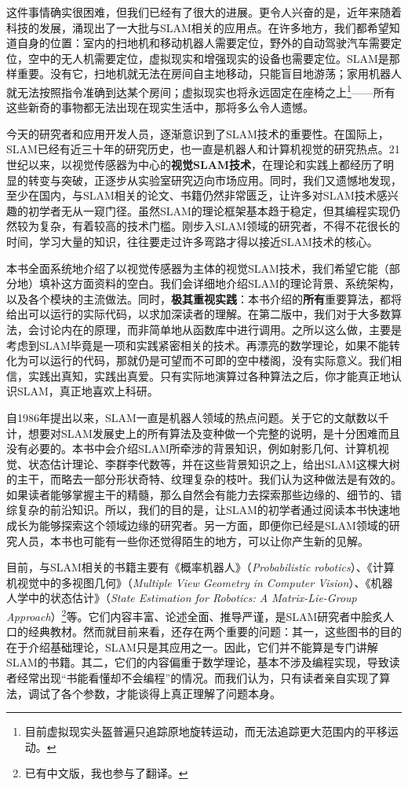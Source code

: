 这件事情确实很困难，但我们已经有了很大的进展。更令人兴奋的是，近年来随着科技的发展，涌现出了一大批与SLAM相关的应用点。在许多地方，我们都希望知道自身的位置：室内的扫地机和移动机器人需要定位，野外的自动驾驶汽车需要定位，空中的无人机需要定位，虚拟现实和增强现实的设备也需要定位。SLAM是那样重要。没有它，扫地机就无法在房间自主地移动，只能盲目地游荡；家用机器人就无法按照指令准确到达某个房间；虚拟现实也将永远固定在座椅之上\footnote{目前虚拟现实头盔普遍只追踪原地旋转运动，而无法追踪更大范围内的平移运动。}——所有这些新奇的事物都无法出现在现实生活中，那将多么令人遗憾。

今天的研究者和应用开发人员，逐渐意识到了SLAM技术的重要性。在国际上，SLAM已经有近三十年的研究历史，也一直是机器人和计算机视觉的研究热点。21世纪以来，以视觉传感器为中心的\textbf{视觉SLAM技术}，在理论和实践上都经历了明显的转变与突破，正逐步从实验室研究迈向市场应用。同时，我们又遗憾地发现，至少在国内，与SLAM相关的论文、书籍仍然非常匮乏，让许多对SLAM技术感兴趣的初学者无从一窥门径。虽然SLAM的理论框架基本趋于稳定，但其编程实现仍然较为复杂，有着较高的技术门槛。刚步入SLAM领域的研究者，不得不花很长的时间，学习大量的知识，往往要走过许多弯路才得以接近SLAM技术的核心。

本书全面系统地介绍了以视觉传感器为主体的视觉SLAM技术，我们希望它能（部分地）填补这方面资料的空白。我们会详细地介绍SLAM的理论背景、系统架构，以及各个模块的主流做法。同时，\textbf{极其重视实践}：本书介绍的\textbf{所有}重要算法，都将给出可以运行的实际代码，以求加深读者的理解。在第二版中，我们对于大多数算法，会讨论内在的原理，而非简单地从函数库中进行调用。之所以这么做，主要是考虑到SLAM毕竟是一项和实践紧密相关的技术。再漂亮的数学理论，如果不能转化为可以运行的代码，那就仍是可望而不可即的空中楼阁，没有实际意义。我们相信，实践出真知，实践出真爱。只有实际地演算过各种算法之后，你才能真正地认识SLAM，真正地喜欢上科研。

自1986年提出以来\textsuperscript{\cite{Smith1986}}，SLAM一直是机器人领域的热点问题。关于它的文献数以千计，想要对SLAM发展史上的所有算法及变种做一个完整的说明，是十分困难而且没有必要的。本书中会介绍SLAM所牵涉的背景知识，例如射影几何、计算机视觉、状态估计理论、李群李代数等，并在这些背景知识之上，给出SLAM这棵大树的主干，而略去一部分形状奇特、纹理复杂的枝叶。我们认为这种做法是有效的。如果读者能够掌握主干的精髓，那么自然会有能力去探索那些边缘的、细节的、错综复杂的前沿知识。所以，我们的目的是，让SLAM的初学者通过阅读本书快速地成长为能够探索这个领域边缘的研究者。另一方面，即便你已经是SLAM领域的研究人员，本书也可能有一些你还觉得陌生的地方，可以让你产生新的见解。

目前，与SLAM相关的书籍主要有《概率机器人》（\textit{Probabilistic robotics}）\textsuperscript{\cite{Thrun2005}}、《计算机视觉中的多视图几何》（\textit{Multiple View Geometry in Computer Vision}）\textsuperscript{\cite{Hartley2003}}、《机器人学中的状态估计》（\textit{State Estimation for Robotics: A Matrix-Lie-Group Approach}）\textsuperscript{\cite{Barfoot2016}}\footnote{已有中文版，我也参与了翻译。}等。它们内容丰富、论述全面、推导严谨，是SLAM研究者中脍炙人口的经典教材。然而就目前来看，还存在两个重要的问题：其一，这些图书的目的在于介绍基础理论，SLAM只是其应用之一。因此，它们并不能算是专门讲解SLAM的书籍。其二，它们的内容偏重于数学理论，基本不涉及编程实现，导致读者经常出现“书能看懂却不会编程”的情况。而我们认为，只有读者亲自实现了算法，调试了各个参数，才能谈得上真正理解了问题本身。


